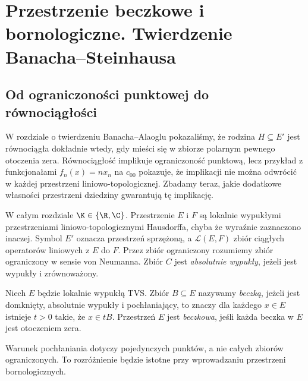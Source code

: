 \setcounter{section}{9}
\section{Przestrzenie beczkowe i bornologiczne. Twierdzenie Banacha--Steinhausa}\label{sec:beczkowe-bornologiczne}

\providecommand{\atlasref}[2]{#2}


\subsection{Od ograniczoności punktowej do równociągłości}

W rozdziale o twierdzeniu Banacha--Alaoglu pokazaliśmy, że rodzina
$H\subseteq E'$ jest równociągła dokładnie wtedy, gdy mieści się
w zbiorze polarnym pewnego otoczenia zera. Równociągłość implikuje
ograniczoność punktową, lecz przykład z funkcjonałami $f_n(x)=nx_n$ na $c_{00}$ pokazuje, że implikacji nie można odwrócić w każdej
przestrzeni liniowo-topologicznej. Zbadamy teraz, jakie dodatkowe
własności przestrzeni dziedziny gwarantują tę implikację.

W całym rozdziale $\K\in\{\R,\C\}$. Przestrzenie $E$ i $F$
są lokalnie wypukłymi przestrzeniami liniowo-topologicznymi Hausdorffa,
chyba że wyraźnie zaznaczono inaczej. Symbol $E'$ oznacza przestrzeń
sprzężoną, a $\mathcal L(E,F)$ zbiór ciągłych operatorów
liniowych z $E$ do $F$. Przez zbiór ograniczony rozumiemy zbiór
ograniczony w sensie von Neumanna. Zbiór $C$ jest \emph{absolutnie
wypukły}, jeżeli jest wypukły i zrównoważony.

\begin{definicja}\label{def:beczka}
Niech $E$ będzie lokalnie wypukłą TVS. Zbiór $B\subseteq E$
nazywamy \emph{beczką}, jeżeli jest domknięty, absolutnie wypukły
i pochłaniający, to znaczy dla każdego $x\in E$ istnieje $t>0$
takie, że $x\in tB$. Przestrzeń $E$ jest \emph{beczkowa}, jeśli
każda beczka w $E$ jest otoczeniem zera.
\end{definicja}

Warunek pochłaniania dotyczy pojedynczych punktów, a nie całych
zbiorów ograniczonych. To rozróżnienie będzie istotne przy
wprowadzaniu przestrzeni bornologicznych.

